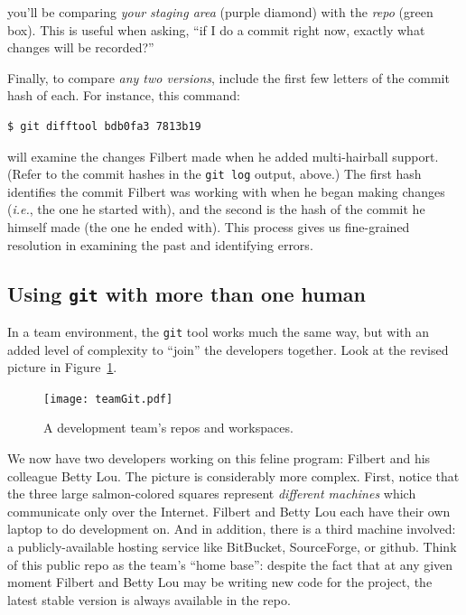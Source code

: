 you'll be comparing \textit{your staging area} (purple diamond) with the
\textit{repo} (green box). This is useful when asking, ``if I do a commit
right now, exactly what changes will be recorded?''

Finally, to compare \textit{any two versions}, include the first few letters
of the commit hash of each. For instance, this command:

\begin{Verbatim}[fontsize=\small,samepage=true,frame=none]
$ git difftool bdb0fa3 7813b19
\end{Verbatim}

will examine the changes Filbert made when he added multi-hairball support.
(Refer to the commit hashes in the \texttt{git log} output, above.) The first
hash identifies the commit Filbert was working with when he began making
changes (\textit{i.e.}, the one he started with), and the second is the hash
of the commit he himself made (the one he ended with). This process gives us
fine-grained resolution in examining the past and identifying errors.



\subsection{Using \texttt{git} with more than one human}

In a team environment, the \texttt{git} tool works much the same way, but with
an added level of complexity to ``join'' the developers together. Look at the
revised picture in Figure~\ref{fig:teamGit}.

\begin{figure}
\centering
\hspace*{-.1in}
\texttt{[image: teamGit.pdf]}  %
\caption{A development team's repos and workspaces.}
\label{fig:teamGit}
\end{figure}

We now have two developers working on this feline program: Filbert and his
colleague Betty Lou. The picture is considerably more complex. First, notice
that the three large salmon-colored squares represent \textit{different machines}
which communicate only over the Internet. Filbert and Betty Lou each have
their own laptop to do development on. And in addition, there is a third
machine involved: a publicly-available hosting service like BitBucket,
SourceForge, or github. Think of this public repo as the team's ``home base'':
despite the fact that at any given moment Filbert and Betty Lou may be writing
new code for the project, the latest stable version is always available in the
repo.


